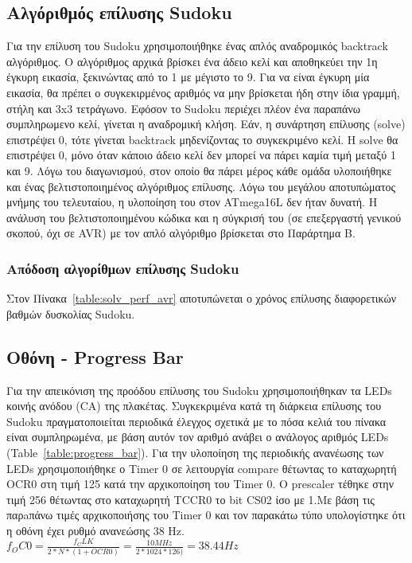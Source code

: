 \documentclass[a4paper,12pt]{article}
\begin{document}
\subsection{Αλγόριθμός επίλυσης Sudoku}
Για την επίλυση του Sudoku χρησιμοποιήθηκε ένας απλός αναδρομικός backtrack αλγόριθμος. Ο αλγόριθμος αρχικά βρίσκει ένα άδειο κελί και αποθηκεύει την 1η έγκυρη εικασία, ξεκινώντας από το 1 με μέγιστο το 9. Για να είναι έγκυρη μία εικασία, θα πρέπει ο συγκεκιρμένος αριθμός να μην βρίσκεται ήδη στην ίδια γραμμή, στήλη και 3x3 τετράγωνο. Εφόσον το Sudoku περιέχει πλέον ένα παραπάνω συμπληρωμενο κελί, γίνεται η αναδρομική κλήση. Εάν, η συνάρτηση επίλυσης (solve) επιστρέψει 0, τότε γίνεται backtrack μηδενίζοντας το συγκεκριμένο κελί. Η solve θα επιστρέψει 0, μόνο όταν κάποιο άδειο κελί δεν μπορεί να πάρει καμία τιμή μεταξύ 1 και 9. Λόγω του διαγωνισμού, στον οποίο θα πάρει μέρος κάθε ομάδα υλοποιήθηκε και ένας βελτιστοποιημένος αλγόριθμος επίλυσης. Λόγω του μεγάλου αποτυπώματος μνήμης του τελευταίου, η υλοποίηση του στον ATmega16L δεν ήταν δυνατή. Η ανάλυση του βελτιστοποιημένου κώδικα και η σύγκρισή του (σε επεξεργαστή γενικού σκοπού, όχι σε AVR) με τον απλό αλγόριθμο βρίσκεται στο Παράρτημα Β.\\


\subsubsection{Απόδοση αλγορίθμων επίλυσης Sudoku}
Στον Πίνακα~\ref{table:solv_perf_avr} αποτυπώνεται ο χρόνος επίλυσης διαφορετικών βαθμών δυσκολίας Sudoku.


\subsection{Οθόνη - Progress Bar}
Για την απεικόνιση της προόδου επίλυσης του Sudoku χρησιμοποιήθηκαν τα LEDs κοινής ανόδου (CA) της πλακέτας. Συγκεκριμένα κατά τη διάρκεια επίλυσης του Sudoku πραγματοποιείται περιοδικά έλεγχος σχετικά με το πόσα κελιά του πίνακα είναι συμπληρωμένα, με βάση αυτόν τον αριθμό ανάβει ο ανάλογος αριθμός LEDs (Table~\ref{table:progress_bar}).
Για την υλοποίηση της περιοδικής ανανέωσης των LEDs χρησιμοποιήθηκε ο Timer 0 σε λειτουργία compare θέτωντας το καταχωρητή OCR0 στη τιμή 125 κατά την αρχικοποίηση του Timer 0. Ο prescaler τέθηκε στην τιμή 256 θέτωντας στο καταχωρητή TCCR0 το bit CS02 ίσο με 1.Με βάση τις παρaπάνω τιμές αρχικοποιήσης του Timer 0 και τον παρακάτω τύπο υπολογίστηκε ότι η οθόνη έχει ρυθμό ανανεώσης 38 Hz.\\
$f_OC0 =\frac{f_CLK}{2*N*(1+OCR0)} = \frac{10 MHz}{2*1024*126)} = 38.44 Hz$ \\
\end{document}
